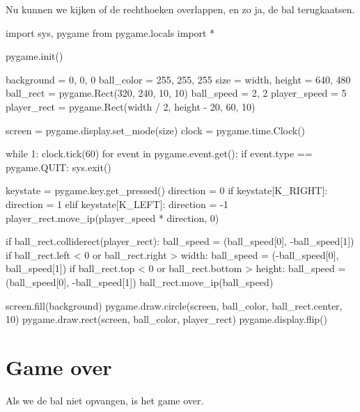 \documentclass[10pt,a4paper]{article}
\begin{document}
Nu kunnen we kijken of de rechthoeken overlappen, en zo ja, de bal terugkaatsen.

\begin{python}
import sys, pygame
from pygame.locals import *

pygame.init()

background = 0, 0, 0
ball_color = 255, 255, 255
size = width, height = 640, 480
ball_rect = pygame.Rect(320, 240, 10, 10)
ball_speed = 2, 2
player_speed = 5
player_rect = pygame.Rect(width / 2, height - 20, 60, 10)

screen = pygame.display.set_mode(size)
clock = pygame.time.Clock()

while 1:
    clock.tick(60)
    for event in pygame.event.get():
        if event.type == pygame.QUIT: sys.exit()
    
    keystate = pygame.key.get_pressed()
    direction = 0
    if keystate[K_RIGHT]:
        direction = 1
    elif keystate[K_LEFT]:
        direction = -1
    player_rect.move_ip(player_speed * direction, 0)

    if ball_rect.colliderect(player_rect):
        ball_speed = (ball_speed[0], -ball_speed[1])
    if ball_rect.left < 0 or ball_rect.right > width:
        ball_speed = (-ball_speed[0], ball_speed[1])
    if ball_rect.top < 0 or ball_rect.bottom > height:
        ball_speed = (ball_speed[0], -ball_speed[1])
    ball_rect.move_ip(ball_speed)
    
    screen.fill(background)
    pygame.draw.circle(screen, ball_color, ball_rect.center, 10)
    pygame.draw.rect(screen, ball_color, player_rect)
    pygame.display.flip()
\end{python}

\newpage
\section{Game over}

Als we de bal niet opvangen, is het game over.
\end{document}
